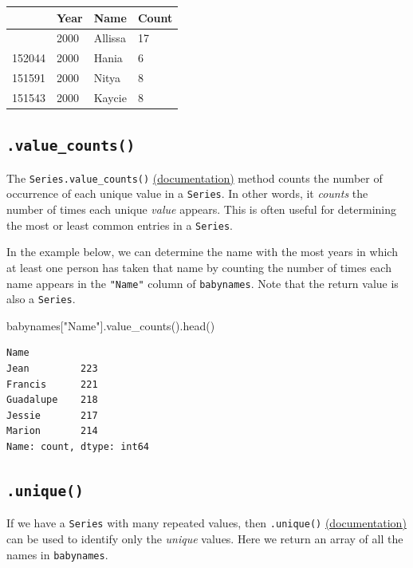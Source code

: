 \documentclass[
  letterpaper,
  DIV=11,
  numbers=noendperiod]{scrreprt}
\newenvironment{Shaded}{\begin{snugshade}}{\end{snugshade}}
\newcommand{\NormalTok}[1]{\textcolor[rgb]{0.00,0.23,0.31}{#1}}
\newcommand{\StringTok}[1]{\textcolor[rgb]{0.13,0.47,0.30}{#1}}
\begin{document}
\begin{longtable}[]{@{}llll@{}}
\toprule\noalign{}
& Year & Name & Count \\
\midrule\noalign{}
\endhead
\bottomrule\noalign{}
\endlastfoot
150479 & 2000 & Allissa & 17 \\
152044 & 2000 & Hania & 6 \\
151591 & 2000 & Nitya & 8 \\
151543 & 2000 & Kaycie & 8 \\
\end{longtable}

\subsection{\texorpdfstring{\texttt{.value\_counts()}}{.value\_counts()}}\label{value_counts}

The \texttt{Series.value\_counts()}
\href{https://pandas.pydata.org/docs/reference/api/pandas.Series.value_counts.html}{(documentation)}
method counts the number of occurrence of each unique value in a
\texttt{Series}. In other words, it \emph{counts} the number of times
each unique \emph{value} appears. This is often useful for determining
the most or least common entries in a \texttt{Series}.

In the example below, we can determine the name with the most years in
which at least one person has taken that name by counting the number of
times each name appears in the \texttt{"Name"} column of
\texttt{babynames}. Note that the return value is also a
\texttt{Series}.

\begin{Shaded}
\begin{Highlighting}[]
\NormalTok{babynames[}\StringTok{"Name"}\NormalTok{].value\_counts().head()}
\end{Highlighting}
\end{Shaded}

\begin{verbatim}
Name
Jean         223
Francis      221
Guadalupe    218
Jessie       217
Marion       214
Name: count, dtype: int64
\end{verbatim}

\subsection{\texorpdfstring{\texttt{.unique()}}{.unique()}}\label{unique}

If we have a \texttt{Series} with many repeated values, then
\texttt{.unique()}
\href{https://pandas.pydata.org/docs/reference/api/pandas.unique.html}{(documentation)}
can be used to identify only the \emph{unique} values. Here we return an
array of all the names in \texttt{babynames}.
\end{document}
